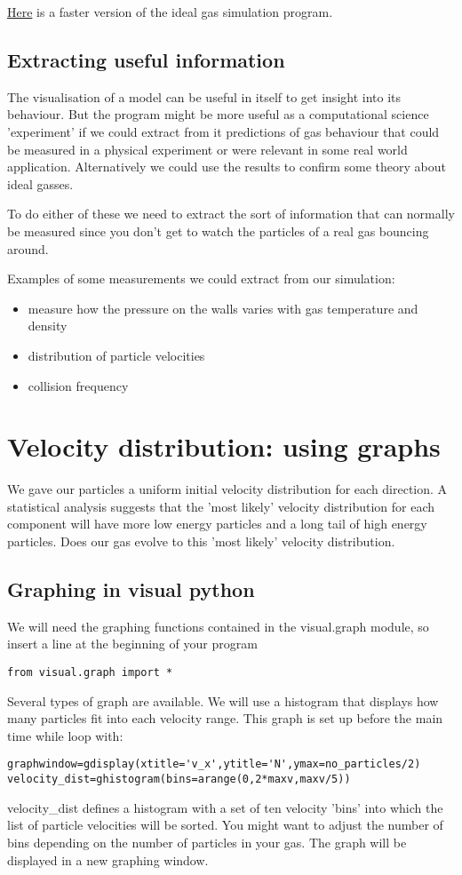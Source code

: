 \documentclass[12pt]{article}
\begin{document}
\href{quickbounce1.html}{Here} is a faster version of the ideal gas simulation program.

\subsection{Extracting useful information}
The visualisation of a model can be useful in itself to get insight into its behaviour.
But the program might be more useful as a computational science 'experiment' if we
could extract from it predictions of gas behaviour that could be measured in a
physical experiment or were relevant in some real world application.
Alternatively we could use the results to confirm some theory about ideal gasses.

To do either of these we need to extract the sort of information that can normally
be measured since you don't get to watch the particles of a real gas bouncing around.

Examples of some measurements we could extract from our simulation:
\begin{itemize}
\item{measure how the pressure on the walls varies with gas temperature and density}
\item{distribution of particle velocities}
\item{collision frequency}
\end{itemize}
\section{Velocity distribution: using graphs}
We gave our particles a uniform initial velocity distribution for each direction.
A statistical analysis suggests that the 'most likely' velocity distribution for each
component will have more low energy particles and a long tail of high energy particles.
Does our gas evolve to this 'most likely' velocity distribution.

\subsection{Graphing in visual python}
We will need the graphing functions contained in the visual.graph module, so insert a line
at the beginning of your program
{\color{code}\begin{verbatim}
from visual.graph import *
\end{verbatim}}
Several types of graph are available.
We will use a histogram that displays how many particles fit into each velocity range.
This graph is set up before the main time while loop with:
{\color{code}\begin{verbatim}
graphwindow=gdisplay(xtitle='v_x',ytitle='N',ymax=no_particles/2)
velocity_dist=ghistogram(bins=arange(0,2*maxv,maxv/5))
\end{verbatim}}
{\color{code}velocity\_dist} defines a histogram with a set of ten velocity 'bins' into which the list of
particle velocities will be sorted.
You might want to adjust the number of bins depending on the number of particles in your gas.
The graph will be displayed in a new graphing window.
\end{document}
